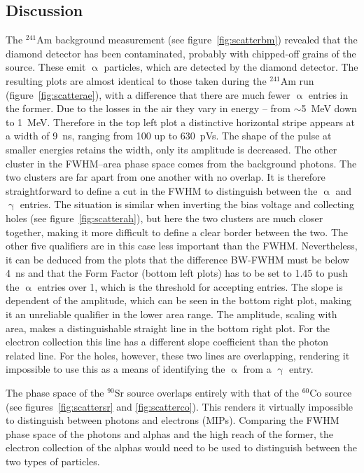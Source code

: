 \documentclass[12pt]{packages/mytustyle}  %
\begin{document}
\subsection{Discussion}
The $^{241}$Am background measurement (see figure~\ref{fig:scatterbm}) revealed that the diamond detector has been contaminated, probably with chipped-off grains of the source. These emit $\upalpha$ particles, which are detected by the diamond detector. The resulting plots are almost identical to those taken during the $^{241}$Am run (figure~\ref{fig:scatterae}), with a difference that there are much fewer $\upalpha$ entries in the former. Due to the losses in the air they vary in energy -- from $\sim$5~MeV down to 1~MeV. Therefore in the top left plot a distinctive horizontal stripe appears at a width of 9~ns, ranging from 100 up to 630~pVs. The shape of the pulse at smaller energies retains the width, only its amplitude is decreased. The other cluster in the FWHM--area phase space comes from the background photons. The two clusters are far apart from one another with no overlap. It is therefore straightforward to define a cut in the FWHM to distinguish between the $\upalpha$ and $\upgamma$ entries. The situation is similar when inverting the bias voltage and collecting holes (see figure~\ref{fig:scatterah}), but here the two clusters are much closer together, making it more difficult to define a clear border between the two. The other five qualifiers are in this case less important than the FWHM. Nevertheless, it can be deduced from the plots that the difference BW-FWHM must be below 4~ns and that the Form Factor (bottom left plots) has to be set to 1.45 to push the $\upalpha$ entries over 1, which is the threshold for accepting entries. The slope is dependent of the amplitude, which can be seen in the bottom right plot, making it an unreliable qualifier in the lower area range. The amplitude, scaling with area, makes a distinguishable straight line in the bottom right plot. For the electron collection this line has a different slope coefficient than the photon related line. For the holes, however, these two lines are overlapping, rendering it impossible to use this as a means of identifying the $\upalpha$ from a $\upgamma$ entry.

The phase space of the $^{90}$Sr source overlaps entirely with that of the $^{60}$Co source (see figures~\ref{fig:scattersr} and \ref{fig:scatterco}). This renders it virtually impossible to distinguish between photons and electrons (MIPs). Comparing the FWHM phase space of the photons and alphas and the high reach of the former, the electron collection of the alphas would need to be used to distinguish between the two types of particles. 
\end{document}
